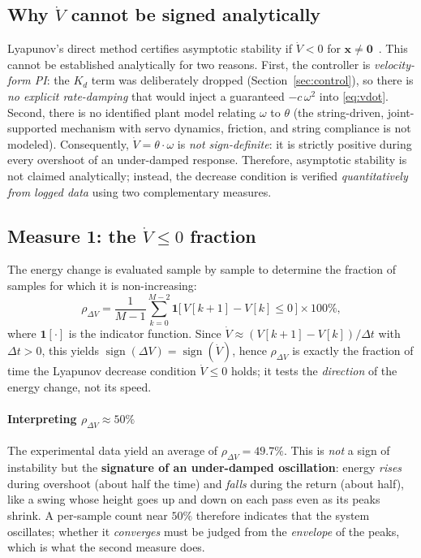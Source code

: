 \documentclass[conference]{IEEEtran}
\begin{document}
\subsection{Why $\dot V$ cannot be signed analytically}
Lyapunov's direct method certifies asymptotic stability if $\dot V<0$ for
$\mathbf x\ne\mathbf 0$~\cite{khalil2002nonlinear,slotine1991applied}. This cannot
be established analytically for two reasons. First, the controller is
\emph{velocity-form PI}: the $K_d$ term was deliberately dropped
(Section~\ref{sec:control}), so there is \emph{no explicit rate-damping} that would inject a
guaranteed $-c\,\omega^2$ into \eqref{eq:vdot}. Second, there is no identified
plant model relating $\omega$ to $\theta$ (the string-driven, joint-supported
mechanism with servo dynamics, friction, and string compliance is not modeled).
Consequently, $\dot V=\theta\cdot\omega$ is \emph{not sign-definite}: it is
strictly positive during every overshoot of an under-damped response. Therefore,
asymptotic stability is not claimed analytically; instead, the decrease condition
is verified \emph{quantitatively from logged data} using two
complementary measures.

\subsection{Measure 1: the $\dot V\le 0$ fraction}
The energy change is evaluated sample by sample to determine the fraction of samples for which it is non-increasing:
\begin{equation}
  \rho_{\Delta V}=\frac{1}{M-1}\sum_{k=0}^{M-2}
  \mathbf 1\!\big[\,V[k{+}1]-V[k]\le 0\,\big]\times 100\%,
\end{equation}
where $\mathbf 1[\cdot]$ is the indicator function. Since
$\dot V\approx (V[k{+}1]-V[k])/\Delta t$ with $\Delta t>0$, this yields
$\operatorname{sign}(\Delta V)=\operatorname{sign}(\dot V)$, hence $\rho_{\Delta V}$
is exactly the fraction of time the Lyapunov decrease condition $\dot V\le 0$
holds; it tests the \emph{direction} of the energy change, not its speed.

\paragraph{Interpreting $\rho_{\Delta V}\approx 50\%$}
The experimental data yield an average of $\rho_{\Delta V}=49.7\%$. This is \emph{not} a sign of
instability but the \textbf{signature of an under-damped oscillation}: energy
\emph{rises} during overshoot (about half the time) and \emph{falls} during the
return (about half), like a swing whose height goes up and down on each pass
even as its peaks shrink. A per-sample count near $50\%$ therefore indicates that the
system oscillates; whether it \emph{converges} must be judged from the
\emph{envelope} of the peaks, which is what the second measure does.
\end{document}
